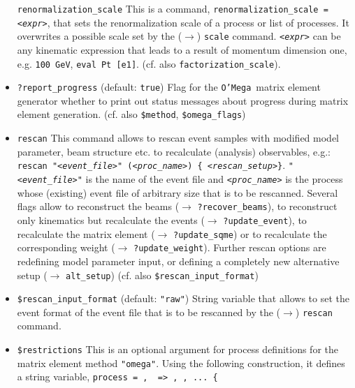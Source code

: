 \documentclass[12pt]{book}
\newcommand{\ttt}[1]{\texttt{#1}}
\newcommand{\oMega}{\texttt{O'Mega}}
\begin{document}
\begin{itemize}
\ttt{renormalization\_scale} \newline
This is a command, \ttt{renormalization\_scale = {\em <expr>}}, that sets
the renormalization scale of a process or list of processes. It
overwrites a possible scale set by the ($\to$) \ttt{scale} command. 
\ttt{{\em <expr>}} can be any kinematic expression that leads to a result of
momentum dimension one, e.g. \ttt{100 GeV}, \ttt{eval
Pt [e1]}. (cf. also \ttt{factorization\_scale}). 
\item
\ttt{?report\_progress} \qquad (default: \ttt{true}) \newline
Flag for the \oMega\ matrix element generator whether to print out
status messages about progress during matrix element
generation. (cf. also \ttt{\$method}, \ttt{\$omega\_flags})
\item
\ttt{rescan} \newline
This command allows to rescan event samples with modified model
parameter, beam structure etc. to recalculate (analysis) observables,
e.g.: \newline 
\ttt{rescan "{\em <event\_file>}" ({\em <proc\_name>}) \{ {\em <rescan\_setup>}\}}. 
\newline 
\ttt{"{\em <event\_file>}"} is the name of the event file and
\ttt{{\em <proc\_name>}} is the process whose (existing) event 
file of arbitrary size that is to be rescanned. Several flags allow to
reconstruct the beams ($\to$ \ttt{?recover\_beams}), to reconstruct
only kinematics but recalculate the events ($\to$
\ttt{?update\_event}), to recalculate the matrix element ($\to$
\ttt{?update\_sqme}) or to recalculate the corresponding weight ($\to$
\ttt{?update\_weight}). Further rescan options are redefining model
parameter input, or defining a completely new alternative setup ($\to$
\ttt{alt\_setup}) (cf. also \ttt{\$rescan\_input\_format})  
\item
\ttt{\$rescan\_input\_format} \qquad (default: \ttt{"raw"}) \newline
String variable that allows to set the event format of the event file 
that is to be rescanned by the ($\to$) \ttt{rescan} command. 
\item
\ttt{\$restrictions} \newline
This is an optional argument for process definitions for the matrix
element method \ttt{"omega"}. Using the following construction, it
defines a string variable, \ttt{process  =
  {\em <particle1>}, {\em <particle2>} => {\em <particle3>}, {\em <particle4>}, ... \{
}
\end{itemize}
\end{document}
